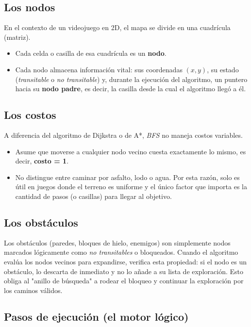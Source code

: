 \documentclass[12pt,letterpaper]{article}
\begin{document}
\subsection{Los nodos}

En el contexto de un videojuego en 2D, el mapa se divide en una cuadrícula (matriz).

\begin{itemize}
  \item Cada celda o casilla de esa cuadrícula es un \textbf{nodo}.
  \item Cada nodo almacena información vital: sus coordenadas $(x, y)$, su estado (\textit{transitable} o \textit{no transitable}) y, durante la ejecución del algoritmo, un puntero hacia su \textbf{nodo padre}, es decir, la casilla desde la cual el algoritmo llegó a él.
\end{itemize}

\subsection{Los costos}

A diferencia del algoritmo de Dijkstra o de A*, \textit{BFS} no maneja costos variables.

\begin{itemize}
  \item Asume que moverse a cualquier nodo vecino cuesta exactamente lo mismo, es decir, \textbf{costo = 1}.
  \item No distingue entre caminar por asfalto, lodo o agua. Por esta razón, solo es útil en juegos donde el terreno es uniforme y el único factor que importa es la cantidad de pasos (o casillas) para llegar al objetivo.
\end{itemize}

\subsection{Los obstáculos}

Los obstáculos (paredes, bloques de hielo, enemigos) son simplemente nodos marcados lógicamente como \textit{no transitables} o bloqueados. Cuando el algoritmo evalúa los nodos vecinos para expandirse, verifica esta propiedad: si el nodo es un obstáculo, lo descarta de inmediato y no lo añade a su lista de exploración. Esto obliga al "anillo de búsqueda" a rodear el bloqueo y continuar la exploración por los caminos válidos.

\subsection{Pasos de ejecución (el motor lógico)}
\end{document}
